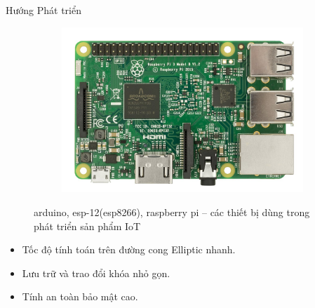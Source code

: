 \documentclass[compress]{beamer}
\begin{document}
\begin{frame}{Hướng Phát triển}
\begin{figure}[h]
\begin{subfigure}{.3\textwidth}
  \label{fig:sfig2}
\end{subfigure}
\begin{subfigure}{.3\textwidth}
  \centering
  \includegraphics[width=1\linewidth]{../ras.jpg}
  \label{fig:sfig2}
\end{subfigure}
\caption{arduino, esp-12(esp8266), raspberry pi – các thiết bị dùng trong phát triển sản phẩm IoT} \label{h6.3}
\end{figure}
\begin{itemize}
\item Tốc độ tính toán trên đường cong Elliptic nhanh.
\item Lưu trữ và trao đổi khóa nhỏ gọn.
\item Tính an toàn bảo mật cao.
\end{itemize}
\end{frame}
\end{document}
